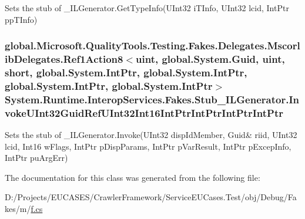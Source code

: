 Sets the stub of \-\_\-\-I\-L\-Generator.\-Get\-Type\-Info(\-U\-Int32 i\-T\-Info, U\-Int32 lcid, Int\-Ptr pp\-T\-Info)

\hypertarget{class_system_1_1_runtime_1_1_interop_services_1_1_fakes_1_1_stub___i_l_generator_a049323e52e2ce2ef375e81a65c7a2d40}{
\subsubsection[{Invoke\-U\-Int32\-Guid\-Ref\-U\-Int32\-Int16\-Int\-Ptr\-Int\-Ptr\-Int\-Ptr\-Int\-Ptr}]{\setlength{\rightskip}{0pt plus 5cm}global.\-Microsoft.\-Quality\-Tools.\-Testing.\-Fakes.\-Delegates.\-Mscorlib\-Delegates.\-Ref1\-Action8$<$uint, global.\-System.\-Guid, uint, short, global.\-System.\-Int\-Ptr, global.\-System.\-Int\-Ptr, global.\-System.\-Int\-Ptr, global.\-System.\-Int\-Ptr$>$ System.\-Runtime.\-Interop\-Services.\-Fakes.\-Stub\-\_\-\-I\-L\-Generator.\-Invoke\-U\-Int32\-Guid\-Ref\-U\-Int32\-Int16\-Int\-Ptr\-Int\-Ptr\-Int\-Ptr\-Int\-Ptr}}\label{class_system_1_1_runtime_1_1_interop_services_1_1_fakes_1_1_stub___i_l_generator_a049323e52e2ce2ef375e81a65c7a2d40}


Sets the stub of \-\_\-\-I\-L\-Generator.\-Invoke(U\-Int32 disp\-Id\-Member, Guid\& riid, U\-Int32 lcid, Int16 w\-Flags, Int\-Ptr p\-Disp\-Params, Int\-Ptr p\-Var\-Result, Int\-Ptr p\-Excep\-Info, Int\-Ptr pu\-Arg\-Err)



The documentation for this class was generated from the following file\-:\begin{DoxyCompactItemize}
\item 
D\-:/\-Projects/\-E\-U\-C\-A\-S\-E\-S/\-Crawler\-Framework/\-Service\-E\-U\-Cases.\-Test/obj/\-Debug/\-Fakes/m/\hyperlink{m_2f_8cs}{f.\-cs}\end{DoxyCompactItemize}
